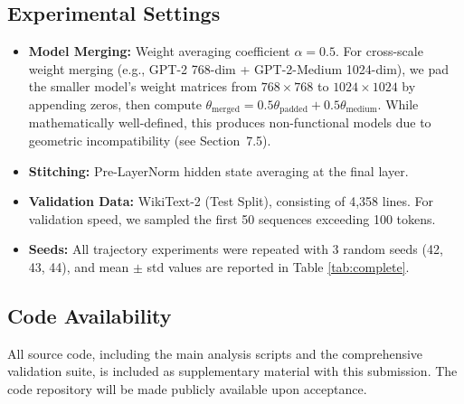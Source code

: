 \documentclass[10pt]{article} %
\theoremstyle{plain}
\theoremstyle{definition}
\theoremstyle{remark}
\begin{document}
\subsection{Experimental Settings}
\begin{itemize}
    \item \textbf{Model Merging:} Weight averaging coefficient $\alpha = 0.5$. For cross-scale weight merging (e.g., GPT-2 768-dim + GPT-2-Medium 1024-dim), we pad the smaller model's weight matrices from $768 \times 768$ to $1024 \times 1024$ by appending zeros, then compute $\theta_{\text{merged}} = 0.5\theta_{\text{padded}} + 0.5\theta_{\text{medium}}$. While mathematically well-defined, this produces non-functional models due to geometric incompatibility (see Section~7.5).
    \item \textbf{Stitching:} Pre-LayerNorm hidden state averaging at the final layer.
    \item \textbf{Validation Data:} WikiText-2 (Test Split), consisting of 4,358 lines. For validation speed, we sampled the first 50 sequences exceeding 100 tokens.
    \item \textbf{Seeds:} All trajectory experiments were repeated with 3 random seeds (42, 43, 44), and mean $\pm$ std values are reported in Table \ref{tab:complete}.
\end{itemize}

\subsection{Code Availability}
All source code, including the main analysis scripts and the comprehensive validation suite, is included as supplementary material with this submission. The code repository will be made publicly available upon acceptance.
\end{document}
